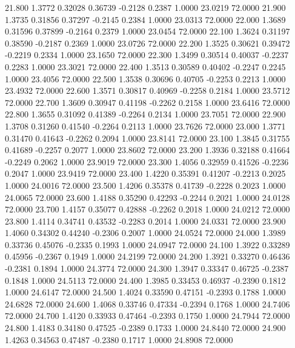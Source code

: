   21.800   1.3772   0.32028   0.36739  -0.2128   0.2387   1.0000  23.0219  72.0000
  21.900   1.3735   0.31856   0.37297  -0.2145   0.2384   1.0000  23.0313  72.0000
  22.000   1.3689   0.31596   0.37899  -0.2164   0.2379   1.0000  23.0454  72.0000
  22.100   1.3624   0.31197   0.38590  -0.2187   0.2369   1.0000  23.0726  72.0000
  22.200   1.3525   0.30621   0.39472  -0.2219   0.2334   1.0000  23.1650  72.0000
  22.300   1.3499   0.30514   0.40037  -0.2237   0.2283   1.0000  23.3021  72.0000
  22.400   1.3513   0.30589   0.40402  -0.2247   0.2245   1.0000  23.4056  72.0000
  22.500   1.3538   0.30696   0.40705  -0.2253   0.2213   1.0000  23.4932  72.0000
  22.600   1.3571   0.30817   0.40969  -0.2258   0.2184   1.0000  23.5712  72.0000
  22.700   1.3609   0.30947   0.41198  -0.2262   0.2158   1.0000  23.6416  72.0000
  22.800   1.3655   0.31092   0.41389  -0.2264   0.2134   1.0000  23.7051  72.0000
  22.900   1.3708   0.31260   0.41540  -0.2264   0.2113   1.0000  23.7626  72.0000
  23.000   1.3771   0.31470   0.41643  -0.2262   0.2094   1.0000  23.8141  72.0000
  23.100   1.3845   0.31755   0.41689  -0.2257   0.2077   1.0000  23.8602  72.0000
  23.200   1.3936   0.32188   0.41664  -0.2249   0.2062   1.0000  23.9019  72.0000
  23.300   1.4056   0.32959   0.41526  -0.2236   0.2047   1.0000  23.9419  72.0000
  23.400   1.4220   0.35391   0.41207  -0.2213   0.2025   1.0000  24.0016  72.0000
  23.500   1.4206   0.35378   0.41739  -0.2228   0.2023   1.0000  24.0065  72.0000
  23.600   1.4188   0.35290   0.42293  -0.2244   0.2021   1.0000  24.0128  72.0000
  23.700   1.4157   0.35077   0.42888  -0.2262   0.2018   1.0000  24.0212  72.0000
  23.800   1.4114   0.34741   0.43532  -0.2283   0.2014   1.0000  24.0331  72.0000
  23.900   1.4060   0.34302   0.44240  -0.2306   0.2007   1.0000  24.0524  72.0000
  24.000   1.3989   0.33736   0.45076  -0.2335   0.1993   1.0000  24.0947  72.0000
  24.100   1.3922   0.33289   0.45956  -0.2367   0.1949   1.0000  24.2199  72.0000
  24.200   1.3921   0.33270   0.46436  -0.2381   0.1894   1.0000  24.3774  72.0000
  24.300   1.3947   0.33347   0.46725  -0.2387   0.1848   1.0000  24.5113  72.0000
  24.400   1.3985   0.33453   0.46937  -0.2390   0.1812   1.0000  24.6147  72.0000
  24.500   1.4024   0.33590   0.47151  -0.2393   0.1788   1.0000  24.6828  72.0000
  24.600   1.4068   0.33746   0.47334  -0.2394   0.1768   1.0000  24.7406  72.0000
  24.700   1.4120   0.33933   0.47464  -0.2393   0.1750   1.0000  24.7944  72.0000
  24.800   1.4183   0.34180   0.47525  -0.2389   0.1733   1.0000  24.8440  72.0000
  24.900   1.4263   0.34563   0.47487  -0.2380   0.1717   1.0000  24.8908  72.0000
